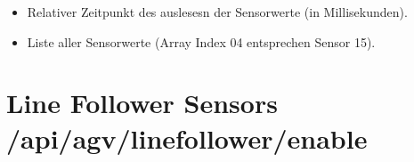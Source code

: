 \documentclass[letterpaper,10pt,english]{sphinxmanual}
\begin{document}
\begin{sphinxVerbatim}[commandchars=\\\{\}]
\PYG{p}{[}\PYG{p}{]}
\end{sphinxVerbatim}

\sphinxAtStartPar
{}
\begin{itemize}
\item {} 
\sphinxAtStartPar
{}  \sphinxhyphen{} Relativer Zeitpunkt des auslesesn der Sensorwerte (in Millisekunden).

\item {} 
\sphinxAtStartPar
{}  \textendash{} Liste aller Sensorwerte (Array Index 0\textendash{}4 entsprechen Sensor 1\textendash{}5).

\end{itemize}


\section{Line Follower Sensors \textendash{} /api/agv/linefollower/enable}
\label{\detokenize{agv_rest_api_linefollower:line-follower-sensors-api-agv-linefollower-enable}}\label{\detokenize{agv_rest_api_linefollower:post-api-agv-line-follower-enable}}
\end{document}
